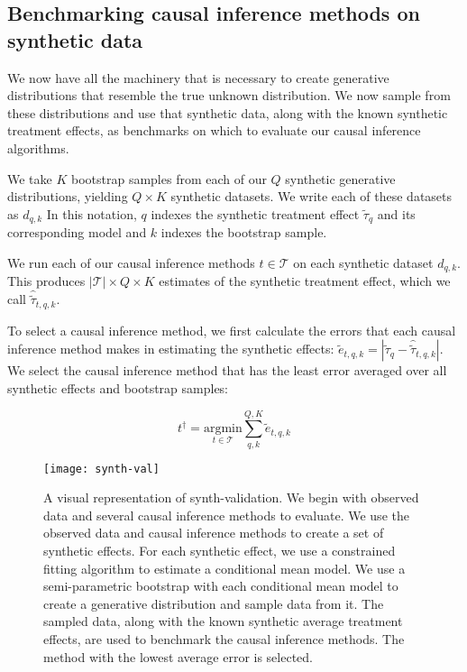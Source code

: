 \subsection{Benchmarking causal inference methods on synthetic data}
\label{sec:run-meth}

We now have all the machinery that is necessary to create generative distributions that resemble the true unknown distribution. We now sample from these distributions and use that synthetic data, along with the known synthetic treatment effects, as benchmarks on which to evaluate our causal inference algorithms.

We take $K$ bootstrap samples from each of our $Q$ synthetic generative distributions, yielding $Q \times K$ synthetic datasets. We write each of these datasets as $d_{q,k}$ In this notation, $q$ indexes the synthetic treatment effect $\tilde\tau_q$ and its corresponding model and $k$ indexes the bootstrap sample.

We run each of our causal inference methods $t \in \mathcal{T}$ on each synthetic dataset $d_{q,k}$. This produces $|\mathcal{T}| \times Q \times K$ estimates of the synthetic treatment effect, which we call $\hat{\tilde\tau}_{t,q,k}$. 

To select a causal inference method, we first calculate the errors that each causal inference method makes in estimating the synthetic effects: $\tilde{e}_{t,q,k} = |\tilde\tau_q - \hat{\tilde\tau}_{t,q,k}|$. We select the causal inference method that has the least error averaged over all synthetic effects and bootstrap samples:

\begin{equation}
t^{\dagger} = \underset{t \in \mathcal{T}}{\text{argmin}} \sum_{q,k}^{Q,K} \tilde{e}_{t,q,k}
\label{eq:best-meth}
\end{equation}

\begin{figure}[h!]
\centering
\texttt{[image: synth-val]} 
\caption{A visual representation of synth-validation. We begin with observed data and several causal inference methods to evaluate. We use the observed data and causal inference methods to create a set of synthetic effects. For each synthetic effect, we use a constrained fitting algorithm to estimate a conditional mean model. We use a semi-parametric bootstrap with each conditional mean model to create a generative distribution and sample data from it. The sampled data, along with the known synthetic average treatment effects, are used to benchmark the causal inference methods. The method with the lowest average error is selected.}
\label{fig:synth-val}
\end{figure}